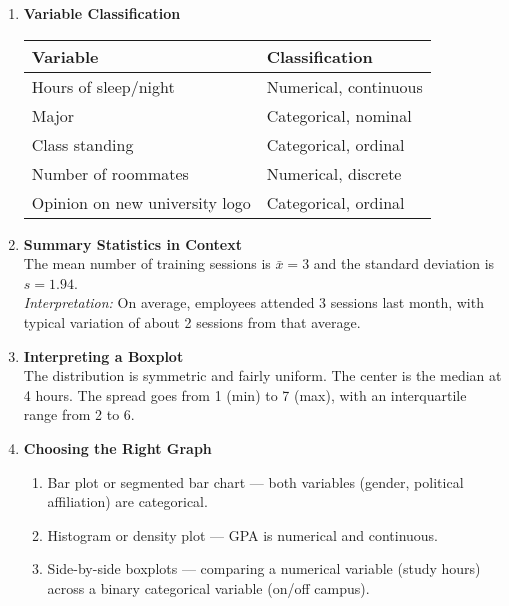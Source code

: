 \documentclass{article}
\begin{document}
\begin{enumerate}

  \item \textbf{Variable Classification}
  \begin{center}
  \begin{tabular}{|l|l|}
  \hline
  \textbf{Variable} & \textbf{Classification} \\
  \hline
  Hours of sleep/night & Numerical, continuous \\
  Major & Categorical, nominal \\
  Class standing & Categorical, ordinal \\
  Number of roommates & Numerical, discrete \\
  Opinion on new university logo & Categorical, ordinal \\
  \hline
  \end{tabular}
  \end{center}

  \item \textbf{Summary Statistics in Context} \\
  The mean number of training sessions is $\bar{x} = 3$ and the standard deviation is $s = 1.94$. \\
  \textit{Interpretation:} On average, employees attended 3 sessions last month, with typical variation of about 2 sessions from that average.

  \item \textbf{Interpreting a Boxplot} \\
  The distribution is symmetric and fairly uniform. The center is the median at 4 hours. The spread goes from 1 (min) to 7 (max), with an interquartile range from 2 to 6.

  \item \textbf{Choosing the Right Graph}
  \begin{enumerate}
    \item Bar plot or segmented bar chart — both variables (gender, political affiliation) are categorical.
    \item Histogram or density plot — GPA is numerical and continuous.
    \item Side-by-side boxplots — comparing a numerical variable (study hours) across a binary categorical variable (on/off campus).
  \end{enumerate}


\end{enumerate}
\end{document}
